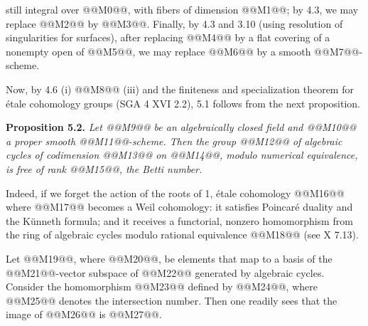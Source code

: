 still integral over @@M0@@, with fibers of dimension @@M1@@; by 4.3, we may replace @@M2@@ by @@M3@@. Finally, by 4.3 and 3.10 (using resolution of singularities for surfaces), after replacing @@M4@@ by a flat covering of a nonempty open of @@M5@@, we may replace @@M6@@ by a smooth @@M7@@-scheme.

Now, by 4.6 (i) @@M8@@ (iii) and the finiteness and specialization theorem for \'etale cohomology groups (SGA 4 XVI 2.2), 5.1 follows from the next proposition.

\textbf{Proposition 5.2.} \emph{Let @@M9@@ be an algebraically closed field and @@M10@@ a proper smooth @@M11@@-scheme. Then the group @@M12@@ of algebraic cycles of codimension @@M13@@ on @@M14@@, modulo numerical equivalence, is free of rank @@M15@@, the Betti number.}

Indeed, if we forget the action of the roots of 1, \'etale cohomology @@M16@@ where @@M17@@ becomes a Weil cohomology: it satisfies Poincar\'e duality and the K\"unneth formula; and it receives a functorial, nonzero homomorphism from the ring of algebraic cycles modulo rational equivalence @@M18@@ (see X 7.13).

Let @@M19@@, where @@M20@@, be elements that map to a basis of the @@M21@@-vector subspace of @@M22@@ generated by algebraic cycles. Consider the homomorphism
@@M23@@
defined by @@M24@@, where @@M25@@ denotes the intersection number. Then one readily sees that the image of @@M26@@ is @@M27@@.

